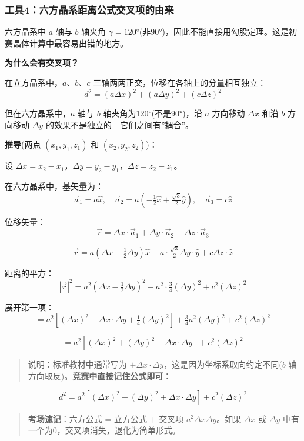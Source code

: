 \subsubsection{工具4：六方晶系距离公式交叉项的由来}\label{ux5de5ux51774ux516dux65b9ux6676ux7cfbux8dddux79bbux516cux5f0fux4ea4ux53c9ux9879ux7684ux7531ux6765}

六方晶系中 \(a\) 轴与 \(b\) 轴夹角 \(\gamma = 120°\)(非90°)，因此不能直接用勾股定理。这是初赛晶体计算中最容易出错的地方。

\textbf{为什么会有交叉项？}

在立方晶系中，\(a\)、\(b\)、\(c\) 三轴两两正交，位移在各轴上的分量相互独立：
\[d^2 = (a\Delta x)^2 + (a\Delta y)^2 + (c\Delta z)^2\]

但在六方晶系中，\(a\) 轴与 \(b\) 轴夹角为120°(不是90°)，沿 \(a\) 方向移动 \(\Delta x\) 和沿 \(b\) 方向移动 \(\Delta y\) 的效果不是独立的---它们之间有''耦合''。

\textbf{推导}(两点 \((x_1,y_1,z_1)\) 和 \((x_2,y_2,z_2)\))：

设 \(\Delta x = x_2 - x_1\)，\(\Delta y = y_2 - y_1\)，\(\Delta z = z_2 - z_1\)。

在六方晶系中，基矢量为：
\[\vec{a}_1 = a\hat{x}, \quad \vec{a}_2 = a(-\tfrac{1}{2}\hat{x} + \tfrac{\sqrt{3}}{2}\hat{y}), \quad \vec{a}_3 = c\hat{z}\]

位移矢量：
\[\vec{r} = \Delta x \cdot \vec{a}_1 + \Delta y \cdot \vec{a}_2 + \Delta z \cdot \vec{a}_3\]

\[\vec{r} = a(\Delta x - \tfrac{1}{2}\Delta y)\hat{x} + a \cdot \tfrac{\sqrt{3}}{2}\Delta y \cdot \hat{y} + c\Delta z \cdot \hat{z}\]

距离的平方：
\[|\vec{r}|^2 = a^2(\Delta x - \tfrac{1}{2}\Delta y)^2 + a^2 \cdot \tfrac{3}{4}(\Delta y)^2 + c^2(\Delta z)^2\]

展开第一项：
\[= a^2[(\Delta x)^2 - \Delta x \cdot \Delta y + \tfrac{1}{4}(\Delta y)^2] + \tfrac{3}{4}a^2(\Delta y)^2 + c^2(\Delta z)^2\]

\[= a^2[(\Delta x)^2 + (\Delta y)^2 - \Delta x \cdot \Delta y] + c^2(\Delta z)^2\]

\begin{quote}
说明：标准教材中通常写为 \(+\Delta x \cdot \Delta y\)，这是因为坐标系取向约定不同(\(b\) 轴方向取反)。\textbf{竞赛中直接记住公式即可}：
\end{quote}

\[\boxed{d^2 = a^2[(\Delta x)^2 + (\Delta y)^2 + \Delta x \cdot \Delta y] + c^2(\Delta z)^2}\]

\begin{quote}
\textbf{考场速记}：六方公式 = 立方公式 + 交叉项 \(a^2 \Delta x \Delta y\)。如果 \(\Delta x\) 或 \(\Delta y\) 中有一个为0，交叉项消失，退化为简单形式。
\end{quote}

